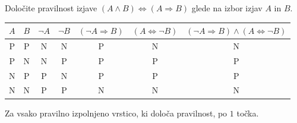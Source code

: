\documentclass[addpoints]{exam}
\begin{document}
\begin{questions}

    
    \question[4]
    Določite pravilnost izjave $( A \land  B)\Leftrightarrow \left(A\Rightarrow  B\right)$ glede na izbor izjav $A$ in $B$.

    \begin{solution}[9cm]
        \begin{table}[H]
            \begin{tabular}{ccccccc}
             $A$ & $B$ & $\lnot A$ & $\lnot B$ & $(\lnot A\Rightarrow B)$ & $(A\Leftrightarrow \lnot B)$ & $(\lnot A\Rightarrow B)\land(A\Leftrightarrow \lnot B)$\\ \hline
             P & P & N & N & P & N & N \\ 
             P & N & N & P & P & P & P \\
             N & P & P & N & P & P & P \\
             N & N & P & P & N & N & N
            \end{tabular}
        \end{table}
        Za vsako pravilno izpolnjeno vrstico, ki določa pravilnost, po $1$ točka.
    \end{solution}










\end{questions}
\end{document}
